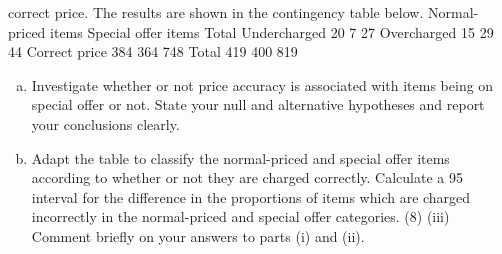 correct price. The results are shown in the contingency table below.
Normal-priced items Special offer items Total
Undercharged 20 7 27
Overcharged 15 29 44
Correct price 384 364 748
Total 419 400 819
\begin{enumerate}[(a)]
\item Investigate whether or not price accuracy is associated with items being on
special offer or not. State your null and alternative hypotheses and report your
conclusions clearly.
\item  Adapt the table to classify the normal-priced and special offer items according
to whether or not they are charged correctly. Calculate a 95%
interval for the difference in the proportions of items which are charged
incorrectly in the normal-priced and special offer categories.
(8)
(iii) Comment briefly on your answers to parts (i) and (ii).
\end{enumerate}

